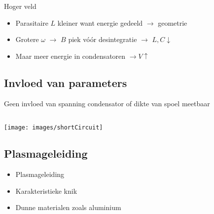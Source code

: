 \documentclass{beamer}
\newcommand{\includeGraph}[2]{
	\begin{center}
	\scalebox{#1}{
		
	}
	\end{center}
}
\begin{document}
\begin{frame}
\includeGraph{0.8}{bplot}
\end{frame}

\begin{frame}
Hoger veld
\begin{itemize}
\item Parasitaire $L$ kleiner want energie gedeeld $\rightarrow$ geometrie
\item Grotere $\omega$ $\rightarrow$ $B$ piek v\'o\'or desintegratie 
$\rightarrow$ $L,C\downarrow$
\item Maar meer energie in condensatoren $\rightarrow V \uparrow$
\end{itemize}
\end{frame}



\subsection{Invloed van parameters}
\begin{frame}
\centering Geen invloed van spanning condensator of dikte van spoel meetbaar

\begin{columns}
\begin{column}{0.5\textwidth}
\includeGraph{0.6}{BvasteD}
\end{column}
\begin{column}{0.5\textwidth}
\includeGraph{0.6}{BvasteV}
\end{column}
\end{columns}

\end{frame}

\begin{frame}
\begin{center}
	\texttt{[image: images/shortCircuit]}
\end{center}
\end{frame}


\subsection{Plasmageleiding}
\begin{frame}

\begin{itemize}
\item Plasmageleiding
\item Karakteristieke knik
\item Dunne materialen zoals aluminium
\end{itemize}

\includeGraph{0.6}{plasma2}
\end{frame}
\end{document}
